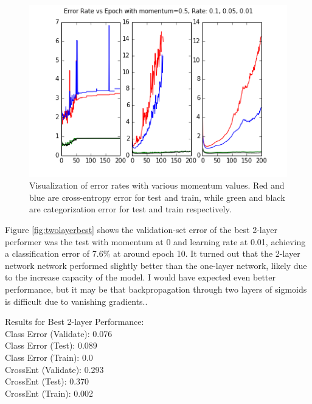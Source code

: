\documentclass{article}
\begin{document}
\begin{figure}[h]
  \centering
  \includegraphics[scale=0.6]{../momentum5_rate10501.png} 
  \caption{Visualization of error rates with various momentum values. Red and blue are cross-entropy error for test and train, while green and black are categorization error for test and train respectively. }
  \label{fig:momentumsrate3}
\end{figure}


Figure \ref{fig:twolayerbest} shows the validation-set error of the best 2-layer performer was the test with momentum at 0 and learning rate at 0.01, achieving a classification error of 7.6\% at around epoch 10. It turned out that the 2-layer network network performed slightly better than the one-layer network, likely due to the increase capacity of the model.  I would have expected even better performance, but it may be that backpropagation through two layers of sigmoids is difficult due to vanishing gradients.. 

\newpage
Results for Best 2-layer Performance:\\
Class Error (Validate): 0.076\\
Class Error (Test):		0.089\\
Class Error (Train):	0.0\\
CrossEnt (Validate):	0.293\\
CrossEnt (Test):		0.370\\
CrossEnt (Train): 		0.002\\
\end{document}
